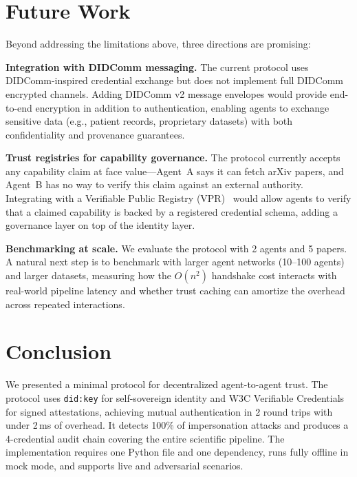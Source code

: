 \documentclass[11pt]{article}
\newcommand{\didkey}{\texttt{did:key}}
\newcommand{\vcs}{Verifiable Credentials}
\begin{document}
\section{Future Work}

Beyond addressing the limitations above, three directions are promising:

\textbf{Integration with DIDComm messaging.} The current protocol uses DIDComm-inspired credential exchange but does not implement full DIDComm encrypted channels. Adding DIDComm v2 message envelopes would provide end-to-end encryption in addition to authentication, enabling agents to exchange sensitive data (e.g., patient records, proprietary datasets) with both confidentiality and provenance guarantees.

\textbf{Trust registries for capability governance.} The protocol currently accepts any capability claim at face value---Agent~A says it can fetch arXiv papers, and Agent~B has no way to verify this claim against an external authority. Integrating with a Verifiable Public Registry (VPR)~\cite{verana_vpr} would allow agents to verify that a claimed capability is backed by a registered credential schema, adding a governance layer on top of the identity layer.

\textbf{Benchmarking at scale.} We evaluate the protocol with 2 agents and 5 papers. A natural next step is to benchmark with larger agent networks (10--100 agents) and larger datasets, measuring how the $O(n^2)$ handshake cost interacts with real-world pipeline latency and whether trust caching can amortize the overhead across repeated interactions.

\section{Conclusion}

We presented a minimal protocol for decentralized agent-to-agent trust. The protocol uses \didkey{} for self-sovereign identity and W3C \vcs{} for signed attestations, achieving mutual authentication in 2 round trips with under 2\,ms of overhead. It detects 100\% of impersonation attacks and produces a 4-credential audit chain covering the entire scientific pipeline. The implementation requires one Python file and one dependency, runs fully offline in mock mode, and supports live and adversarial scenarios.
\end{document}
